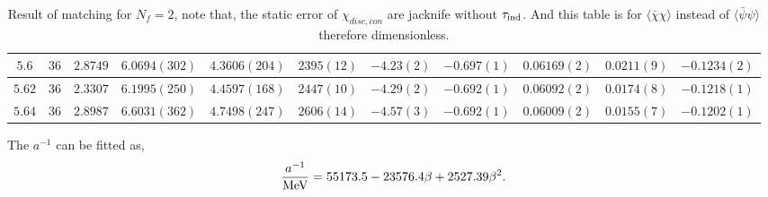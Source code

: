\begin{table}
\begin{center}
\begin{tabular}{c|c|c|c|c|c|c|c|c|c|c}
\hline
$5.6$  & $36$ & $2.8749$ & $6.0694(302)$ & $4.3606(204)$ & $2395(12)$ & $-4.23(2)$ & $-0.697(1)$ & $0.06169(2)$ & $0.0211(9)$ & $-0.1234(2)$ \\
\hline
$5.62$ & $36$ & $2.3307$ & $6.1995(250)$ & $4.4597(168)$ & $2447(10)$ & $-4.29(2)$ & $-0.692(1)$ & $0.06092(2)$ & $0.0174(8)$ & $-0.1218(1)$ \\
\hline
$5.64$ & $36$ & $2.8987$ & $6.6031(362)$ & $4.7498(247)$ & $2606(14)$ & $-4.57(3)$ & $-0.692(1)$ & $0.06009(2)$ & $0.0155(7)$ & $-0.1202(1)$ \\
\hline
\end{tabular}
\end{center}
\caption{\label{tab.res.matchingquench1}Result of matching for $N_f=2$, note that, the static error of $\chi _{disc,con}$ are jacknife without $\tau_{\rm ind}$. And this table is for $\langle \bar{\chi}\chi \rangle $ instead of $\langle \bar{\psi}\psi\rangle$ therefore dimensionless.}
\end{table}

The $a^{-1}$ can be fitted as,
\begin{equation}
\begin{split}
&\frac{a^{-1}}{\rm MeV}=55173.5-23576.4\beta + 2527.39\beta^2.\\
\end{split}
\label{eq.afitam1nf2}
\end{equation}